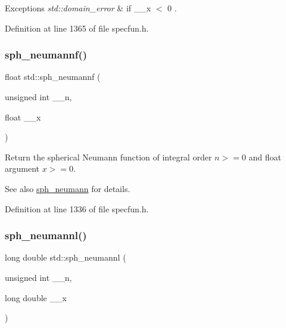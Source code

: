 \begin{DoxyExceptions}{Exceptions}
{\em std\+::domain\+\_\+error} & if {\ttfamily  \+\_\+\+\_\+x $<$ 0 }. \\
\hline
\end{DoxyExceptions}


Definition at line 1365 of file specfun.\+h.

\mbox{\label{group__tr29124__math__spec__func_ga789143122fa99536329bc2d1b1aac2f0}} 
\subsubsection{\texorpdfstring{sph\+\_\+neumannf()}{sph\_neumannf()}}
{\footnotesize\ttfamily float std\+::sph\+\_\+neumannf (\begin{DoxyParamCaption}\item[{unsigned int}]{\+\_\+\+\_\+n,  }\item[{float}]{\+\_\+\+\_\+x }\end{DoxyParamCaption})\hspace{0.3cm}{\ttfamily [inline]}}

Return the spherical Neumann function of integral order $ n >= 0 $ and {\ttfamily float} argument $ x >= 0 $.

\begin{DoxySeeAlso}{See also}
\hyperlink{group__tr29124__math__spec__func_ga01cdd716aaca8ff3c08f307800fd5220}{sph\+\_\+neumann} for details. 
\end{DoxySeeAlso}


Definition at line 1336 of file specfun.\+h.

\mbox{\label{group__tr29124__math__spec__func_ga3cededa9b6e4601f190c3811e6aabfd6}} 
\subsubsection{\texorpdfstring{sph\+\_\+neumannl()}{sph\_neumannl()}}
{\footnotesize\ttfamily long double std\+::sph\+\_\+neumannl (\begin{DoxyParamCaption}\item[{unsigned int}]{\+\_\+\+\_\+n,  }\item[{long double}]{\+\_\+\+\_\+x }\end{DoxyParamCaption})\hspace{0.3cm}{\ttfamily [inline]}}

